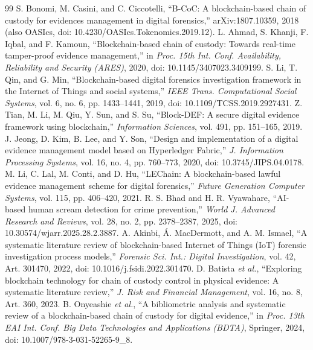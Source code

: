 \documentclass[conference,a4paper,10pt]{IEEEtran}
\begin{document}
\balance
\begin{thebibliography}{99}
 S. Bonomi, M. Casini, and C. Ciccotelli, ``B-CoC: A blockchain-based chain of custody for evidences management in digital forensics,'' arXiv:1807.10359, 2018 (also OASIcs, doi: 10.4230/OASIcs.Tokenomics.2019.12).
 L. Ahmad, S. Khanji, F. Iqbal, and F. Kamoun, ``Blockchain-based chain of custody: Towards real-time tamper-proof evidence management,'' in \emph{Proc. 15th Int. Conf. Availability, Reliability and Security (ARES)}, 2020, doi: 10.1145/3407023.3409199.
 S. Li, T. Qin, and G. Min, ``Blockchain-based digital forensics investigation framework in the Internet of Things and social systems,'' \emph{IEEE Trans. Computational Social Systems}, vol. 6, no. 6, pp. 1433--1441, 2019, doi: 10.1109/TCSS.2019.2927431.
 Z. Tian, M. Li, M. Qiu, Y. Sun, and S. Su, ``Block-DEF: A secure digital evidence framework using blockchain,'' \emph{Information Sciences}, vol. 491, pp. 151--165, 2019.
 J. Jeong, D. Kim, B. Lee, and Y. Son, ``Design and implementation of a digital evidence management model based on Hyperledger Fabric,'' \emph{J. Information Processing Systems}, vol. 16, no. 4, pp. 760--773, 2020, doi: 10.3745/JIPS.04.0178.
 M. Li, C. Lal, M. Conti, and D. Hu, ``LEChain: A blockchain-based lawful evidence management scheme for digital forensics,'' \emph{Future Generation Computer Systems}, vol. 115, pp. 406--420, 2021.
 R. S. Bhad and H. R. Vyawahare, ``AI-based human scream detection for crime prevention,'' \emph{World J. Advanced Research and Reviews}, vol. 28, no. 2, pp. 2378--2387, 2025, doi: 10.30574/wjarr.2025.28.2.3887.
 A. Akinbi, \'A. MacDermott, and A. M. Ismael, ``A systematic literature review of blockchain-based Internet of Things (IoT) forensic investigation process models,'' \emph{Forensic Sci. Int.: Digital Investigation}, vol. 42, Art. 301470, 2022, doi: 10.1016/j.fsidi.2022.301470.
 D. Batista \emph{et al.}, ``Exploring blockchain technology for chain of custody control in physical evidence: A systematic literature review,'' \emph{J. Risk and Financial Management}, vol. 16, no. 8, Art. 360, 2023.
 B. Onyeashie \emph{et al.}, ``A bibliometric analysis and systematic review of a blockchain-based chain of custody for digital evidence,'' in \emph{Proc. 13th EAI Int. Conf. Big Data Technologies and Applications (BDTA)}, Springer, 2024, doi: 10.1007/978-3-031-52265-9\_8.

\end{thebibliography}
\end{document}
